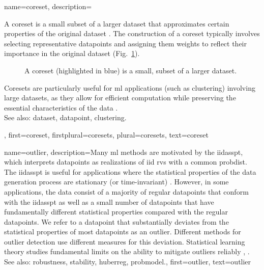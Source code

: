 {name={coreset}, 
	description={A coreset is a small subset of a larger \gls{dataset} 
		that approximates certain properties of the original \gls{dataset} \cite{Chai2023}. 
		The construction of a coreset typically involves selecting representative \glspl{datapoint}
		and assigning them weights to reflect their importance in the original \gls{dataset} (Fig.\ \ref{fig_coreset_dict}).
        \begin{figure}[H]
			\centering
\caption{A coreset (highlighted in blue) is a small, subset of a larger \gls{dataset}. \label{fig_coreset_dict}}
\end{figure}
		Coresets are particularly useful for \gls{ml} applications (such as \gls{clustering}) 
		involving large \glspl{dataset}, as they allow for efficient computation while 
		preserving the essential characteristics of the \gls{data} \cite{DistkmeansBalcan2013}.
				\\
		See also: \gls{dataset}, \gls{datapoint}, \gls{clustering}.},
	first={coreset},
	firstplural={coresets},
	plural={coresets},
	text={coreset} 
}


{name={outlier}, 
	description={Many \gls{ml} methods 
		are motivated by the \gls{iidasspt}, which interprets \glspl{datapoint} as \glspl{realization} of 
		\gls{iid} \glspl{rv} with a common \gls{probdist}. The \gls{iidasspt} is useful for applications  
		where the statistical properties of the \gls{data} generation process are stationary (or time-invariant) \cite{Brockwell91}. 
		However, in some applications, the \gls{data} consist of a majority of regular \glspl{datapoint} 
		that conform with the \gls{iidasspt} as well as a small number of \glspl{datapoint} that have fundamentally different 
       		statistical properties compared with the regular \glspl{datapoint}. We refer to a \gls{datapoint} that 
        		substantially deviates from the statistical properties of most \glspl{datapoint} as an 
        		outlier. Different methods for outlier detection use different measures for this deviation. 
        		Statistical learning theory studies fundamental limits on the ability to mitigate outliers reliably \cite{doi:10.1137/0222052}, \cite{10.1214/20-AOS1961}.
        		\\
		See also: \gls{robustness}, \gls{stability}, \gls{huberreg}, \gls{probmodel}.},
	 first={outlier},
	 text={outlier} 
}

